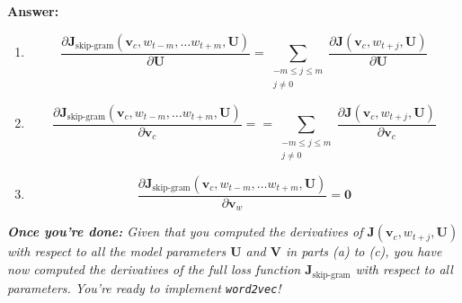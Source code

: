\documentclass{article}
\newenvironment{answer}{
    {\bf Answer:} \sf \begingroup\color{black}
}{\endgroup}%
\begin{document}
\begin{enumerate}[label=(\alph*)]
          \begin{shaded}
              \begin{answer}
                  \begin{enumerate}[label=(\roman*)]
                      \item \begin{equation}
                                {\frac{\partial \bm J_{\textrm{skip-gram}}(\bm v_c, w_{t-m},\ldots w_{t+m}, \bm U)} {\partial \bm U}}
                                = \sum_{\substack{-m\le j \le m \\ j\ne 0}} \frac{\partial \bm J(\bm v_c, w_{t+j}, \bm U)}{\partial \bm U}
                            \end{equation}
                      \item \begin{equation}
                                {\frac{\partial \bm J_{\textrm{skip-gram}}(\bm v_c, w_{t-m},\ldots w_{t+m}, \bm U)} {\partial \bm v_c}}
                                = = \sum_{\substack{-m\le j \le m \\ j\ne 0}} \frac{\partial \bm J(\bm v_c, w_{t+j}, \bm U)}{\partial \bm v_{c}}
                            \end{equation}
                      \item \begin{equation}
                                {\frac{\partial \bm J_{\textrm{skip-gram}}(\bm v_c, w_{t-m},\ldots w_{t+m}, \bm U)} {\partial \bm v_w}}
                                = \bm 0
                            \end{equation}
                  \end{enumerate}
              \end{answer}
          \end{shaded}

          \textit{\textbf{Once you're done:} Given that you computed the derivatives of $\bm J(\bm v_c, w_{t+j}, \bm U)$ with respect to all the model parameters $\bm U$ and $\bm V$ in parts (a) to (c), you have now computed the derivatives of the full loss function $\bm J_{\text{skip-gram}}$ with respect to all parameters. You're ready to implement \texttt{word2vec}!} %

\end{enumerate}
\end{document}

